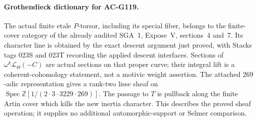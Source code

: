 \paragraph{Grothendieck dictionary for AC-G119.}
The actual finite etale $P$-torsor, including its special fiber, belongs
to the finite-cover category of the already audited SGA~1, Expose~V,
sections~4 and~7.  Its character line is obtained by the exact descent
argument just proved, with Stacks tags 023S and 023T recording the
applied descent interfaces.  Sections of $\omega^k\mathcal L_\Theta(-C)$
are actual sections on that proper curve; their integral lift is a
coherent-cohomology statement, not a motivic weight assertion.
The attached $269$-adic representation gives a rank-two lisse sheaf on
$\operatorname{Spec}\mathbb Z[1/(2\cdot3\cdot3229\cdot269)]$.
The passage to $T$ is pullback along the finite Artin cover which kills
the new inertia character.  This describes the proved sheaf operation;
it supplies no additional automorphic-support or Selmer comparison.
